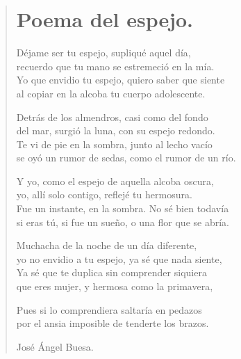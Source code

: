 \documentclass[11pt, portrait, twoside, notitlepage, openright]{book}
\begin{document}
\newpage
\begin{verse}
\begin{center}
\section{Poema del espejo.}
\end{center}
Déjame ser tu espejo, supliqué aquel día,\\
recuerdo que tu mano se estremeció en la mía.\\
Yo que envidio tu espejo, quiero saber que siente\\
al copiar en la alcoba tu cuerpo adolescente.
\newline

Detrás de los almendros, casi como del fondo\\
del mar, surgió la luna, con su espejo redondo.\\
Te vi de pie en la sombra, junto al lecho vacío\\
se oyó un rumor de sedas, como el rumor de un río.
\newline

Y yo, como el espejo de aquella alcoba oscura,\\
yo, allí solo contigo, reflejé tu hermosura.\\
Fue un instante, en la sombra. No sé bien todavía\\
si eras tú, si fue un sueño, o una flor que se abría.
\newline

Muchacha de la noche de un día diferente,\\
yo no envidio a tu espejo, ya sé que nada siente,\\
Ya sé que te duplica sin comprender siquiera\\
que eres mujer, y hermosa como la primavera,
\newline

Pues si lo comprendiera saltaría en pedazos\\
por el ansia imposible de tenderte los brazos.
\newline

José Ángel Buesa.
\end{verse}
\end{document}
